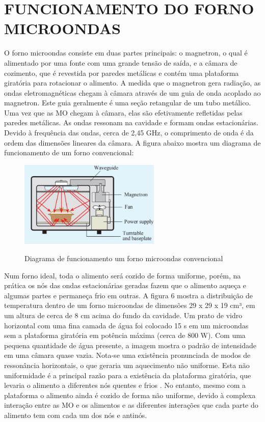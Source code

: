 \section{FUNCIONAMENTO DO FORNO MICROONDAS}
\label{sec:funcMicro}

O forno microondas consiste em duas partes principais: o magnetron, o qual é alimentado por uma fonte com uma grande tensão de saída, e a câmara de cozimento, que é revestida por paredes metálicas e contém uma plataforma giratória para rotacionar o alimento. A medida que o magnetron gera radiação, as ondas eletromagnéticas chegam à câmara através de um guia de onda acoplado ao magnetron. Este guia geralmente é uma seção retangular de um tubo metálico. Uma vez que as MO chegam à câmara, elas são efetivamente refletidas pelas paredes metálicas. As ondas ressonam na cavidade e formam ondas estacionárias. Devido à frequência das ondas, cerca de 2,45 GHz, o comprimento de onda é da ordem das dimensões lineares da câmara. A figura abaixo mostra um diagrama de funcionamento de um forno convencional:

\begin{figure}[!htb]
    \centering
    \caption{Diagrama de funcionamento um forno microondas convencional}
    \includegraphics[width=0.6\textwidth]{./dados/figuras/microwave}
    \label{fig:figura-fontferro}
\end{figure}

Num forno ideal, toda o alimento será cozido de forma uniforme, porém, na prática os nós das ondas estacionárias geradas fazem que o alimento aqueça e algumas partes e permaneça frio em outras. A figura 6 mostra a distribuição de temperatura dentro de um forno microondas de dimensões  29 x 29 x 19 cm³, em um altura de cerca de 8 cm acima do fundo da cavidade. Um prato de vidro horizontal  com uma fina camada de água foi colocado 15 s em um microondas sem a plataforma giratória em potência máxima (cerca de 800 W). Com uma pequena quantidade de água presente, a imagem mostra o padrão de intensidade em uma câmara quase vazia. Nota-se uma existência pronunciada de modos de ressonância horizontais, o que geraria um aquecimento não uniforme. Esta não uniformidade é a principal razão para a existência da plataforma giratória, que levaria o alimento a diferentes nós quentes e frios \cite{Vollmer}. No entanto, mesmo com a plataforma o alimento ainda é cozido de forma não uniforme, devido à complexa interação entre as MO e os alimentos e as diferentes interações que cada parte do alimento tem com cada um dos nós e antinós.

